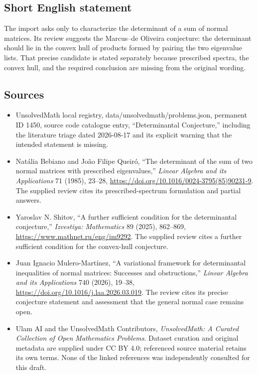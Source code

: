 \documentclass[11pt]{article}
\begin{document}
\subsection{Short English statement}
The import asks only to characterize the determinant of a sum of normal matrices. Its review suggests the Marcus--de Oliveira conjecture: the determinant should lie in the convex hull of products formed by pairing the two eigenvalue lists. That precise candidate is stated separately because prescribed spectra, the convex hull, and the required conclusion are missing from the original wording.
\subsection{Sources}
\begin{itemize}
\item UnsolvedMath local registry, data/unsolvedmath/problems.json, permanent ID 1450, source code catalogue entry, ``Determinantal Conjecture,'' including the literature triage dated 2026-08-17 and its explicit warning that the intended statement is missing.
\item Natália Bebiano and João Filipe Queiró, ``The determinant of the sum of two normal matrices with prescribed eigenvalues,'' \emph{Linear Algebra and its Applications} 71 (1985), 23--28, \url{https://doi.org/10.1016/0024-3795(85)90231-9}. The supplied review cites its prescribed-spectrum formulation and partial answers.
\item Yaroslav N. Shitov, ``A further sufficient condition for the determinantal conjecture,'' \emph{Izvestiya: Mathematics} 89 (2025), 862--869, \url{https://www.mathnet.ru/eng/im9292}. The supplied review cites a further sufficient condition for the convex-hull conjecture.
\item Juan Ignacio Mulero-Martínez, ``A variational framework for determinantal inequalities of normal matrices: Successes and obstructions,'' \emph{Linear Algebra and its Applications} 740 (2026), 19--38, \url{https://doi.org/10.1016/j.laa.2026.03.019}. The review cites its precise conjecture statement and assessment that the general normal case remains open.
\item Ulam AI and the UnsolvedMath Contributors, \emph{UnsolvedMath: A Curated Collection of Open Mathematics Problems}. Dataset curation and original metadata are supplied under CC BY 4.0; referenced source material retains its own terms. None of the linked references was independently consulted for this draft.
\end{itemize}
\end{document}
